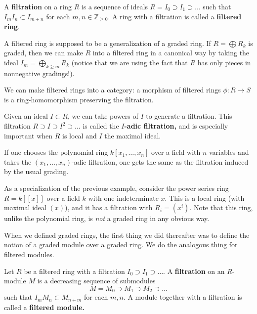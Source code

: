 \begin{definition} 
A \textbf{filtration} on a ring $R$ is a sequence of ideals $R = I_0
\supset I_1 \supset \dots$ such that $I_m I_n \subset I_{m + n}$ for each
$m, n \in \mathbb{Z}_{ \geq 0}$. A ring with a filtration is called a
\textbf{filtered ring}.
\end{definition} 

A filtered ring is supposed to be a generalization of a graded ring. If $R =
\bigoplus R_k$ is graded, then we can make $R$ into a filtered ring in a
canonical way by taking the ideal $I_m = \bigoplus_{k \geq m} R_k$ (notice
that we are using the fact that $R$ has only pieces in nonnegative gradings!).

We can make filtered rings into a category: a morphism of filtered rings $\phi:
R \to S$ is a ring-homomorphism preserving the filtration.


\begin{example}
Given an ideal $I \subset R$, we
can take powers of $I$ to generate a filtration. This filtration $R \supset I
\supset I^2 \supset \dots$ is called the \textbf{$I$-adic filtration,} and is
especially important when $R$ is local and $I$ the maximal ideal.

If one chooses the polynomial ring $k[x_1, \dots, x_n]$ over a field with $n$
variables and takes the $(x_1, \dots, x_n)$-adic filtration, one gets the same
as the filtration induced by the usual grading.
\end{example} 

\begin{example} 
As a specialization of the previous example, consider the power series ring
$R=k[[x]]$ over a field $k$ with one indeterminate $x$. This is a local ring
(with maximal ideal $(x)$), and it has a filtration with $R_i = (x^i)$. 
Note that this ring, unlike the polynomial ring, is \emph{not} a graded ring in
any obvious way.
\end{example} 




When we defined graded rings, the first thing we did thereafter was to define
the notion of a graded module over a graded ring. We do the analogous thing
for filtered modules.

\begin{definition} 
Let $R$ be a filtered ring with a filtration $I_0 \supset I_1 \supset \dots$.
A \textbf{filtration} on an $R$-module $M$ is a decreasing sequence of submodules
\[ M = M_0 \supset M_1 \supset M_2 \supset \dots  \]
such that $I_m M_n \subset M_{n+m}$ for each $m, n$. A module together with a
filtration is called a \textbf{filtered module.}
\end{definition} 


